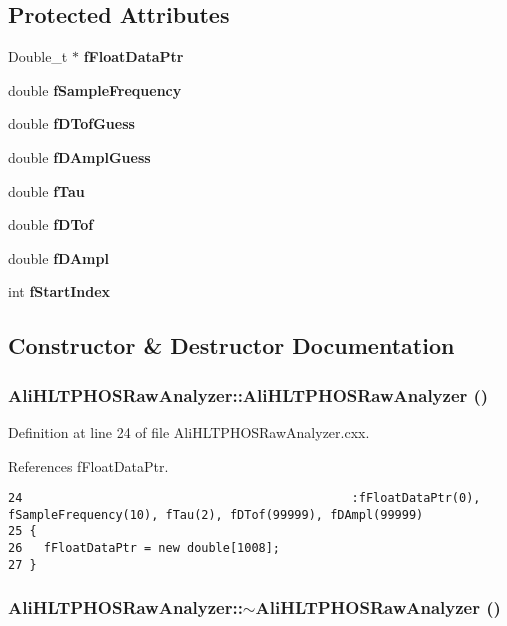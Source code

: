 \subsection*{Protected Attributes}
\begin{CompactItemize}
\item 
Double\_\-t $\ast$ {\bf f\-Float\-Data\-Ptr}
\item 
double {\bf f\-Sample\-Frequency}
\item 
double {\bf f\-DTof\-Guess}
\item 
double {\bf f\-DAmpl\-Guess}
\item 
double {\bf f\-Tau}
\item 
double {\bf f\-DTof}
\item 
double {\bf f\-DAmpl}
\item 
int {\bf f\-Start\-Index}
\end{CompactItemize}


\subsection{Constructor \& Destructor Documentation}
\subsubsection{\setlength{\rightskip}{0pt plus 5cm}Ali\-HLTPHOSRaw\-Analyzer::Ali\-HLTPHOSRaw\-Analyzer ()}\label{classAliHLTPHOSRawAnalyzer_AliHLTPHOSRawAnalyzera0}




Definition at line 24 of file Ali\-HLTPHOSRaw\-Analyzer.cxx.

References f\-Float\-Data\-Ptr.

\footnotesize\begin{verbatim}24                                              :fFloatDataPtr(0), fSampleFrequency(10), fTau(2), fDTof(99999), fDAmpl(99999)
25 {
26   fFloatDataPtr = new double[1008];
27 }
\end{verbatim}\normalsize 


\subsubsection{\setlength{\rightskip}{0pt plus 5cm}Ali\-HLTPHOSRaw\-Analyzer::$\sim${\bf Ali\-HLTPHOSRaw\-Analyzer} ()\hspace{0.3cm}{\tt  [virtual]}}\label{classAliHLTPHOSRawAnalyzer_AliHLTPHOSRawAnalyzera1}




